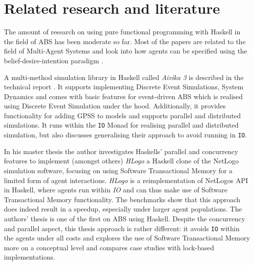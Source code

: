\section{Related research and literature}
\label{sec:literature}
The amount of research on using pure functional programming with Haskell in the field of ABS has been moderate so far. Most of the papers are related to the field of Multi-Agent Systems and look into how agents can be specified using the belief-desire-intention paradigm \cite{de_jong_suitability_2014,jankovic_functional_2007,sulzmann_specifying_2007}.

A multi-method simulation library in Haskell called \textit{Aivika 3} is described in the technical report \cite{sorokin_aivika_2015}. It supports implementing Discrete Event Simulations, System Dynamics and comes with basic features for event-driven ABS which is realised using Discrete Event Simulation under the hood. Additionally, it provides functionality for adding GPSS to models and supports parallel and distributed simulations. It runs within the \texttt{IO} Monad for realising parallel and distributed simulation, but also discusses generalising their approach to avoid running in \texttt{IO}.

In his master thesis \cite{bezirgiannis_improving_2013} the author investigates Haskells' parallel and concurrency features to implement (amongst others) \textit{HLogo} a Haskell clone of the NetLogo \cite{wilensky_introduction_2015} simulation software, focusing on using Software Transactional Memory for a limited form of agent interactions. \textit{HLogo} is a reimplementation of NetLogos API in Haskell, where agents run within \textit{IO} and can thus make use of Software Transactional Memory functionality. The benchmarks show that this approach does indeed result in a speedup, especially under larger agent populations. The authors' thesis is one of the first on ABS using Haskell. Despite the concurrency and parallel aspect, this thesis approach is rather different: it avoids \texttt{IO} within the agents under all costs and explores the use of Software Transactional Memory more on a conceptual level and compares case studies with lock-based implementations.

